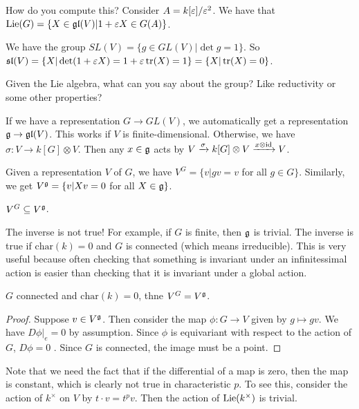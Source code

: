 How do you compute this? Consider $A=k[\varepsilon]/\varepsilon^2$. We have that $\operatorname{Lie}(G)=\{X\in \mathfrak{gl}(V)|1+\varepsilon X\in G(A)\}$.
\begin{example}
 We have the group $SL(V)=\{g\in GL(V)|\det g=1\}$. So $\mathfrak{sl}(V)=\{X|\det(1+\varepsilon X)=1+\varepsilon\operatorname{tr}(X)=1\}=\{X|\operatorname{tr}(X)=0\}$.
\end{example}
Given the Lie algebra, what can you say about the group? Like reductivity or some other properties?

If we have a representation $G\to GL(V)$, we automatically get a representation $\mathfrak{g}\to \mathfrak{gl}(V)$. This works if $V$ is finite-dimensional. Otherwise, we have $\sigma\colon V\to k[G]\otimes V$. Then any $x\in \mathfrak{g}$ acts by $V\xrightarrow{\sigma} k[G]\otimes V\xrightarrow{x\otimes \operatorname{id}}V$.

Given a representation $V$ of $G$, we have $V^G=\{v|gv=v$ for all $g\in G\}$. Similarly, we get $V^{\mathfrak{g}}=\{v|Xv=0$ for all $X\in \mathfrak{g}\}$.
\begin{exercise}
 $V^G\subseteq V^{\mathfrak{g}}$.
\end{exercise}
The inverse is not true! For example, if $G$ is finite, then $\mathfrak{g}$ is trivial. The inverse is true if $\mathrm{char}(k)=0$ and $G$ is connected (which means irreducible). This is very useful because often checking that something is invariant under an infinitessimal action is easier than checking that it is invariant under a global action.
\begin{proposition}
 $G$ connected and $\mathrm{char}(k)=0$, thne $V^G=V^{\mathfrak{g}}$.
\end{proposition}
\begin{proof}
 Suppose $v\in V^{\mathfrak{g}}$. Then consider the map $\phi\colon G\to V$ given by $g\mapsto gv$. We have $D\phi|_e=0$ by assumption. Since $\phi$ is equivariant with respect to the action of $G$, $D\phi=0$ . Since $G$ is connected, the image must be a point. 
\end{proof}
Note that we need the fact that if the differential of a map is zero, then the map is constant, which is clearly not true in characteristic $p$. To see this, consider the action of $k^\times$ on $V$ by $t\cdot v=t^pv$. Then the action of $\operatorname{Lie}(k^\times)$ is trivial.

